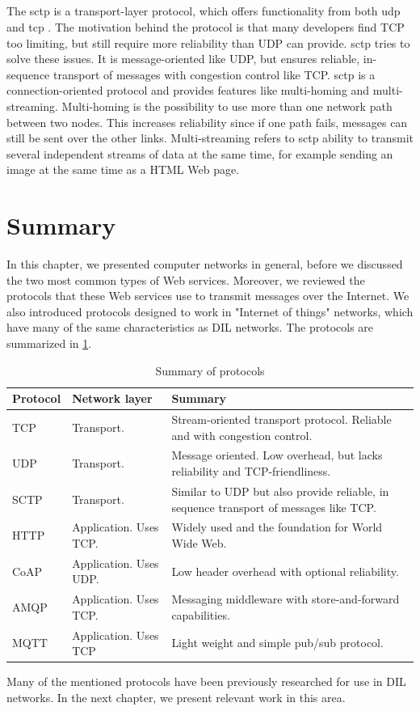 \subsection{}

The \gls{sctp} is a transport-layer protocol, which offers functionality from
both \gls{udp} and \gls{tcp} \cite{rfc-sctp}. The motivation behind the protocol
is that many developers find TCP too limiting, but still require more
reliability than UDP can provide. \gls{sctp} tries to solve these issues. It is
message-oriented like UDP, but ensures reliable, in-sequence transport of
messages with congestion control like TCP. \gls{sctp} is a connection-oriented
protocol and provides features like multi-homing and multi-streaming.
Multi-homing is the possibility to use more than one network path between two
nodes. This increases reliability since if one path fails, messages can still be
sent over the other links. Multi-streaming refers to \gls{sctp} ability to
transmit several independent streams of data at the same time, for example
sending an image at the same time as a HTML Web page.


\section{Summary}

In this chapter, we presented computer networks in general, before we discussed
the two most common types of Web services. Moreover, we reviewed the protocols
that these Web services use to transmit messages over the Internet. We also
introduced protocols designed to work in "Internet of things" networks, which
have many of the same characteristics as DIL networks. The protocols are
summarized in \cref{table:protocols:summary}.

\begin{table}[h]
\begin{tabularx}{\textwidth}{| l | l | X |}
\hline
  \textbf{Protocol} & \textbf{Network layer} & \textbf{Summary} \\ \hline
  TCP & Transport. & Stream-oriented transport protocol. Reliable and with congestion control. \\ \hline
  UDP & Transport. & Message oriented. Low overhead, but lacks reliability and TCP-friendliness. \\ \hline
  SCTP & Transport. & Similar to UDP but also provide reliable, in sequence transport of messages like TCP. \\ \hline
  HTTP & Application. Uses TCP. &  Widely used and the foundation for World Wide Web. \\ \hline
  CoAP & Application. Uses UDP. & Low header overhead with optional reliability. \\ \hline
  AMQP & Application. Uses TCP. &  Messaging middleware with store-and-forward capabilities.\\ \hline
  MQTT & Application. Uses TCP & Light weight and simple pub/sub protocol. \\ \hline
\end{tabularx}
\caption{Summary of protocols}
\label{table:protocols:summary}
\end{table}

Many of the mentioned protocols have been previously researched for use in DIL
networks. In the next chapter, we present relevant work in this area.
